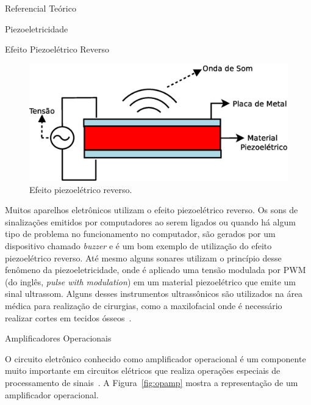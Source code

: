 \begin{chapter}{Referencial Teórico}
\begin{section}{Piezoeletricidade}
\begin{subsection}{Efeito Piezoelétrico Reverso}
\begin{figure}[!h]
	\centering
	\begin{minipage}[c]{\textwidth}
	\centering
	\includegraphics[width=0.9\linewidth]{fig/EfeitoPiezoEletricoReverso}
	\caption{Efeito piezoelétrico reverso.}
	\label{fig:reverso}
	\end{minipage}
\end{figure}

Muitos aparelhos eletrônicos utilizam o efeito piezoelétrico reverso. Os sons de
sinalizações emitidos por computadores ao serem ligados ou quando há algum tipo
de problema no funcionamento no computador, são gerados por um dispositivo
chamado \textit{buzzer} e é um bom exemplo de utilização do efeito piezoelétrico
reverso.  Até mesmo alguns sonares utilizam o princípio desse fenômeno da
piezoeletricidade, onde é aplicado uma tensão modulada por PWM (do inglês,
\textit{pulse with modulation}) em um material piezoelétrico que emite um
sinal ultrassom. Alguns desses instrumentos ultrassônicos são utilizados na área
médica para realização de cirurgias, como a maxilofacial onde é necessário
realizar cortes em tecidos ósseos~\cite{Carvalho17}.

\end{subsection}

\end{section}

\begin{section}{Amplificadores Operacionais} 

O circuito eletrônico conhecido como amplificador operacional é um componente
muito importante em circuitos elétricos que realiza operações especiais de
processamento de sinais~\cite{Richard2000}. A Figura~\ref{fig:opamp} mostra a
representação de um amplificador operacional.


\end{section}
\end{chapter}
